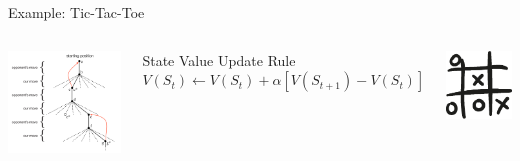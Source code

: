 \documentclass{beamer}
\begin{document}
\begin{frame}{Example: Tic-Tac-Toe}
	\begin{columns}
	\centering
	\includegraphics[width=0.85\linewidth]{Images/tictactoe2.png}\\
	\begin{alertblock}{State Value Update Rule}
		$V(S_t) \leftarrow V(S_t) + \alpha[V(S_{t+1}) - V(S_{t})]$\\
	\end{alertblock}
		\includegraphics[width=\linewidth]{Images/tic-tac-toe-hand-drawn-game.eps}\\
	\end{columns}
\end{frame}
\end{document}
